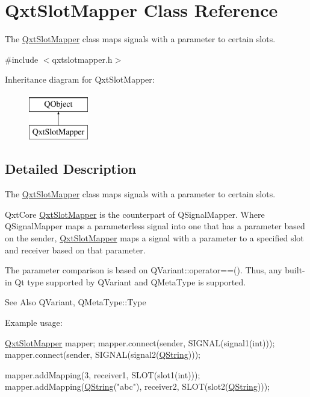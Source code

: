 \hypertarget{class_qxt_slot_mapper}{\section{Qxt\-Slot\-Mapper Class Reference}
\label{class_qxt_slot_mapper}
}


The \hyperlink{class_qxt_slot_mapper}{Qxt\-Slot\-Mapper} class maps signals with a parameter to certain slots.  




{\ttfamily \#include $<$qxtslotmapper.\-h$>$}

Inheritance diagram for Qxt\-Slot\-Mapper\-:\begin{figure}[H]
\begin{center}
\leavevmode
\includegraphics[height=2.000000cm]{class_qxt_slot_mapper}
\end{center}
\end{figure}


\subsection{Detailed Description}
The \hyperlink{class_qxt_slot_mapper}{Qxt\-Slot\-Mapper} class maps signals with a parameter to certain slots. 

Qxt\-Core \hyperlink{class_qxt_slot_mapper}{Qxt\-Slot\-Mapper} is the counterpart of Q\-Signal\-Mapper. Where Q\-Signal\-Mapper maps a parameterless signal into one that has a parameter based on the sender, \hyperlink{class_qxt_slot_mapper}{Qxt\-Slot\-Mapper} maps a signal with a parameter to a specified slot and receiver based on that parameter.

The parameter comparison is based on Q\-Variant\-::operator==(). Thus, any built-\/in Qt type supported by Q\-Variant and Q\-Meta\-Type is supported.

\begin{DoxySeeAlso}{See Also}
Q\-Variant, Q\-Meta\-Type\-::\-Type
\end{DoxySeeAlso}
Example usage\-: 
\begin{DoxyCode}
\hyperlink{class_qxt_slot_mapper}{QxtSlotMapper} mapper;
mapper.connect(sender, SIGNAL(signal1(\textcolor{keywordtype}{int})));
mapper.connect(sender, SIGNAL(signal2(\hyperlink{group___u_a_v_objects_plugin_gab9d252f49c333c94a72f97ce3105a32d}{QString})));

mapper.addMapping(3, receiver1, SLOT(slot1(\textcolor{keywordtype}{int})));
mapper.addMapping(\hyperlink{group___u_a_v_objects_plugin_gab9d252f49c333c94a72f97ce3105a32d}{QString}(\textcolor{stringliteral}{"abc"}), receiver2, SLOT(slot2(\hyperlink{group___u_a_v_objects_plugin_gab9d252f49c333c94a72f97ce3105a32d}{QString})));
\end{DoxyCode}



